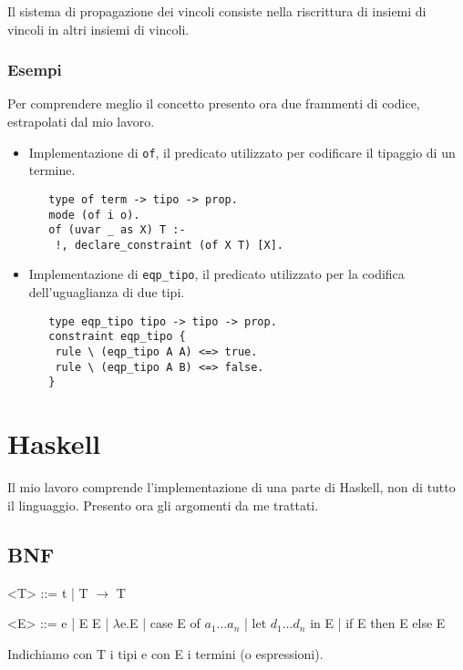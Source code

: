 \documentclass[12pt,a4paper,openright,twoside]{report}
\begin{document}
Il sistema di propagazione dei vincoli consiste nella riscrittura di insiemi di vincoli in altri insiemi di vincoli.

\subsubsection{Esempi}
Per comprendere meglio il concetto presento ora due frammenti di codice, estrapolati dal mio lavoro.\\
\begin{itemize}
 \item Implementazione di \verb"of", il predicato utilizzato per codificare il tipaggio di un termine.
  \begin{verbatim}
   type of term -> tipo -> prop.
   mode (of i o).
   of (uvar _ as X) T :-
    !, declare_constraint (of X T) [X].
  \end{verbatim}
 \item Implementazione di \verb"eqp_tipo", il predicato utilizzato per la codifica dell'uguaglianza di due tipi.
  \begin{verbatim}
   type eqp_tipo tipo -> tipo -> prop.
   constraint eqp_tipo {
    rule \ (eqp_tipo A A) <=> true.
    rule \ (eqp_tipo A B) <=> false.
   }
  \end{verbatim}
\end{itemize}

\section{Haskell}

Il mio lavoro comprende l'implementazione di una parte di Haskell, non di tutto il linguaggio. Presento ora gli argomenti da me trattati.

\subsection{BNF}
\begin{grammar}
 \let\syntleft\relax    %
 \let\syntright\relax   %
 <T> ::= t | T $\rightarrow$ T
 
 <E> ::= e | E E | $\lambda$e.E | case E of $a_1 \ldots a_n$ | let $d_1 \ldots d_n$ in E | if E then E else E
\end{grammar}
Indichiamo con T i tipi e con E i termini (o espressioni).
\end{document}
